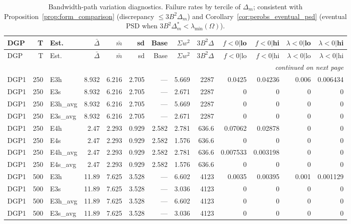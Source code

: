 \begin{tiny}\setlength{\tabcolsep}{3pt}
\begin{longtable}{lrlrrrrrrrrrr}
\caption{Bandwidth-path variation diagnostics. Failure rates by tercile of $\Delta_m$; consistent with Proposition~\ref{prop:form_comparison} (discrepancy $\le 3B^2\Delta_m$) and Corollary~\ref{cor:perobs_eventual_psd} (eventual PSD when $3B^2\Delta_m^* < \lambda_{\min}(\Omega)$).}
\label{tab:mc_variation}\\
\toprule
DGP & T & Est. & $\bar\Delta$ & $\bar m$ & sd & Base & $\Sigma w^2$ & $3B^2\Delta$ & $f\!<\!0|$lo & $f\!<\!0|$hi & $\lambda\!<\!0|$lo & $\lambda\!<\!0|$hi \\
\midrule
\endfirsthead
\toprule
DGP & T & Est. & $\bar\Delta$ & $\bar m$ & sd & Base & $\Sigma w^2$ & $3B^2\Delta$ & $f\!<\!0|$lo & $f\!<\!0|$hi & $\lambda\!<\!0|$lo & $\lambda\!<\!0|$hi \\
\midrule
\endhead
\midrule
\multicolumn{13}{r}{\emph{continued on next page}}\\
\endfoot
\bottomrule
\endlastfoot
DGP1 & 250 & E3h & 8.932 & 6.216 & 2.705 & --- & 5.669 & 2287 & 0.0425 & 0.04236 & 0.006 & 0.006434 \\
DGP1 & 250 & E3s & 8.932 & 6.216 & 2.705 & --- & 2.671 & 2287 & 0 & 0 & 0 & 0 \\
DGP1 & 250 & E3h_avg & 8.932 & 6.216 & 2.705 & --- & 5.669 & 2287 & 0 & 0 & 0 & 0 \\
DGP1 & 250 & E3s_avg & 8.932 & 6.216 & 2.705 & --- & 2.671 & 2287 & 0 & 0 & 0 & 0 \\
DGP1 & 250 & E4h & 2.47 & 2.293 & 0.929 & 2.582 & 2.781 & 636.6 & 0.07062 & 0.02878 & 0 & 0 \\
DGP1 & 250 & E4s & 2.47 & 2.293 & 0.929 & 2.582 & 1.576 & 636.6 & 0 & 0 & 0 & 0 \\
DGP1 & 250 & E4h_avg & 2.47 & 2.293 & 0.929 & 2.582 & 2.781 & 636.6 & 0.007533 & 0.003198 & 0 & 0 \\
DGP1 & 250 & E4s_avg & 2.47 & 2.293 & 0.929 & 2.582 & 1.576 & 636.6 & 0 & 0 & 0 & 0 \\
DGP1 & 500 & E3h & 11.89 & 7.625 & 3.528 & --- & 6.602 & 4123 & 0.0035 & 0.00395 & 0.001 & 0.001129 \\
DGP1 & 500 & E3s & 11.89 & 7.625 & 3.528 & --- & 3.036 & 4123 & 0 & 0 & 0 & 0 \\
DGP1 & 500 & E3h_avg & 11.89 & 7.625 & 3.528 & --- & 6.602 & 4123 & 0 & 0 & 0 & 0 \\
DGP1 & 500 & E3s_avg & 11.89 & 7.625 & 3.528 & --- & 3.036 & 4123 & 0 & 0 & 0 & 0 \\

\end{longtable}
\end{tiny}
